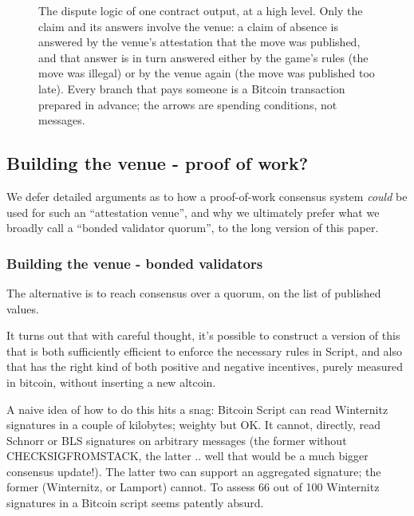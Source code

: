 \documentclass[11pt]{article}
\begin{document}
\begin{figure}[H]
\caption{The dispute logic of one contract output, at a high level. Only
the claim and its answers involve the venue: a claim of absence is
answered by the venue's attestation that the move was published, and
that answer is in turn answered either by the game's rules (the move was
illegal) or by the venue again (the move was published too late). Every
branch that pays someone is a Bitcoin transaction prepared in advance;
the arrows are spending conditions, not messages.}
\label{fig:highlevel}
\end{figure}


\subsection{Building the venue - proof of work?}

We defer detailed arguments as to how a proof-of-work consensus system \emph{could} be used for such an ``attestation venue'', and why we ultimately prefer what we broadly call a ``bonded validator quorum'', to the long version of this paper.

\subsubsection{Building the venue - bonded validators}

The alternative is to reach consensus over a quorum, on the list of published values.

It turns out that with careful thought, it's possible to construct a version of this that is both sufficiently efficient to enforce the necessary rules in Script, and also that has the right kind of both positive and negative incentives, purely measured in bitcoin, without inserting a new altcoin.

A naive idea of how to do this hits a snag: Bitcoin Script can read Winternitz signatures in a couple of kilobytes; weighty but OK. It cannot, directly, read Schnorr or BLS signatures on arbitrary messages (the former without CHECKSIGFROMSTACK, the latter .. well that would be a much bigger consensus update!). The latter two can support an aggregated signature; the former (Winternitz, or Lamport) cannot. To assess 66 out of 100 Winternitz signatures in a Bitcoin script seems patently absurd.
\end{document}
